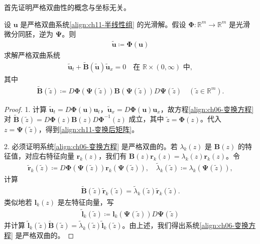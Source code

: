 \documentclass[../../main.tex]{subfiles}
\begin{document}
首先证明严格双曲性的概念与坐标无关。

\begin{theorem}[双曲性在坐标变换下的不变性。]\label{theorem:ch11-双曲性坐标不变性}设 $\mathbf{u}$ 是严格双曲系统\eqref{align:ch11-半线性组} 的光滑解。假设 $\boldsymbol{\Phi}:\mathbb{R}^m\to\mathbb{R}^m$ 是光滑微分同胚，逆为 $\boldsymbol{\Psi}$。则
\begin{align}
\widetilde{\mathbf{u}}\coloneqq\boldsymbol{\Phi}(\mathbf{u})
\label{align:ch11-变量替换}
\end{align}
求解严格双曲系统
\begin{align}
\widetilde{\mathbf{u}}_t+\widetilde{\mathbf{B}}(\widetilde{\mathbf{u}})\widetilde{\mathbf{u}}_x=0 \quad \text{在 } \mathbb{R}\times(0,\infty) \text{ 中},
\label{align:ch06-变换方程}
\end{align}
其中
\begin{align}
\widetilde{\mathbf{B}}(\widetilde{z})\coloneqq D\boldsymbol{\Phi}(\boldsymbol{\Psi}(\widetilde{z}))\mathbf{B}(\boldsymbol{\Psi}(\widetilde{z}))D\boldsymbol{\Psi}(\widetilde{z}) \quad (\widetilde{z}\in\mathbb{R}^m).
\label{align:ch11-变换后矩阵}
\end{align}
\end{theorem}

\begin{proof}
1. 计算 $\widetilde{\mathbf{u}}_t=D\boldsymbol{\Phi}(\mathbf{u})\mathbf{u}_t$，$\widetilde{\mathbf{u}}_x=D\boldsymbol{\Phi}(\mathbf{u})\mathbf{u}_x$，故方程\eqref{align:ch06-变换方程} 对 $\widetilde{\mathbf{B}}(\widetilde{z})=D\boldsymbol{\Phi}(z)\mathbf{B}(z)D\boldsymbol{\Phi}^{-1}(z)$ 成立，其中 $\widetilde{z}=\boldsymbol{\Phi}(z)$。代入 $z=\boldsymbol{\Psi}(\widetilde{z})$，得到\eqref{align:ch11-变换后矩阵}。

2. 必须证明系统\eqref{align:ch06-变换方程} 是严格双曲的。若 $\lambda_k(z)$ 是 $\mathbf{B}(z)$ 的特征值，对应右特征向量 $\mathbf{r}_k(z)$，我们有 $\mathbf{B}(z)\mathbf{r}_k(z)=\lambda_k(z)\mathbf{r}_k(z)$。令
\begin{align*}
\widetilde{\mathbf{r}}_k(\widetilde{z})\coloneqq D\boldsymbol{\Phi}(\boldsymbol{\Psi}(\widetilde{z}))\mathbf{r}_k(\boldsymbol{\Psi}(\widetilde{z})),\quad
\widetilde{\lambda}_k(\widetilde{z})\coloneqq\lambda_k(\boldsymbol{\Psi}(\widetilde{z})),
\end{align*}
计算
\begin{align*}
\widetilde{\mathbf{B}}(\widetilde{z})\widetilde{\mathbf{r}}_k(\widetilde{z})=\widetilde{\lambda}_k(\widetilde{z})\widetilde{\mathbf{r}}_k(\widetilde{z}).
\end{align*}
类似地若 $\mathbf{l}_k(z)$ 是左特征向量，写
\begin{align*}
\widetilde{\mathbf{l}}_k(\widetilde{z})\coloneqq\mathbf{l}_k(\boldsymbol{\Psi}(\widetilde{z}))D\boldsymbol{\Psi}(\widetilde{z})
\end{align*}
并计算 $\widetilde{\mathbf{l}}_k(\widetilde{z})\widetilde{\mathbf{B}}(\widetilde{z})=\widetilde{\lambda}_k(\widetilde{z})\widetilde{\mathbf{l}}_k(\widetilde{z})$。由上述，我们得出系统\eqref{align:ch06-变换方程} 是严格双曲的。
\end{proof}
\end{document}
